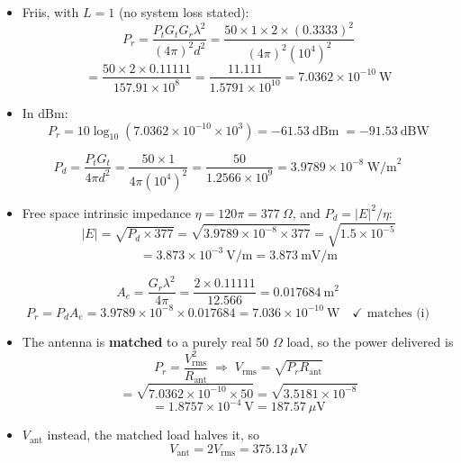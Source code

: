 \begin{itemize}
  \item Friis, with $L = 1$ (no system loss stated):
        \[ P_r = \frac{P_t G_t G_r \lambda^2}{(4\pi)^2 d^2}
               = \frac{50 \times 1 \times 2 \times (0.3333)^2}{(4\pi)^2 (10^4)^2} \]
        \[ = \frac{50 \times 2 \times 0.11111}{157.91 \times 10^{8}}
          = \frac{11.111}{1.5791\times10^{10}} = 7.0362\times10^{-10}\ \text{W} \]
  \item In dBm:
        \[ P_r = 10\log_{10}\!\left(7.0362\times10^{-10}\times10^{3}\right)
               = \boxed{-61.53\ \text{dBm}} \; = -91.53\ \text{dBW} \]
\end{itemize}

\[ P_d = \frac{P_t G_t}{4\pi d^2} = \frac{50 \times 1}{4\pi (10^4)^2}
       = \frac{50}{1.2566\times10^{9}} = \boxed{3.9789\times10^{-8}\ \text{W/m}^2} \]

\begin{itemize}
  \item Free space intrinsic impedance $\eta = 120\pi = 377\ \Omega$, and $P_d = |E|^2/\eta$:
        \[ |E| = \sqrt{P_d \times 377} = \sqrt{3.9789\times10^{-8} \times 377}
               = \sqrt{1.5\times10^{-5}} \]
        \[ = \boxed{3.873\times10^{-3}\ \text{V/m}} = 3.873\ \text{mV/m} \]
\end{itemize}

\[ A_e = \frac{G_r\lambda^2}{4\pi} = \frac{2 \times 0.11111}{12.566} = 0.017684\ \text{m}^2 \]
\[ P_r = P_d A_e = 3.9789\times10^{-8} \times 0.017684 = 7.036\times10^{-10}\ \text{W}
   \quad\checkmark \text{ matches (i)} \]

\begin{itemize}
  \item The antenna is \textbf{matched} to a purely real 50 $\Omega$ load, so the power
        delivered is
        \[ P_r = \frac{V_{\text{rms}}^2}{R_{\text{ant}}}
           \;\Longrightarrow\;
           V_{\text{rms}} = \sqrt{P_r R_{\text{ant}}} \]
        \[ = \sqrt{7.0362\times10^{-10} \times 50} = \sqrt{3.5181\times10^{-8}} \]
        \[ = \boxed{1.8757\times10^{-4}\ \text{V} = 187.57\ \mu\text{V}} \]
  \item {} $V_{\text{ant}}$ instead,
        the matched load halves it, so
        \[ V_{\text{ant}} = 2 V_{\text{rms}} = 375.13\ \mu\text{V} \]
\end{itemize}

